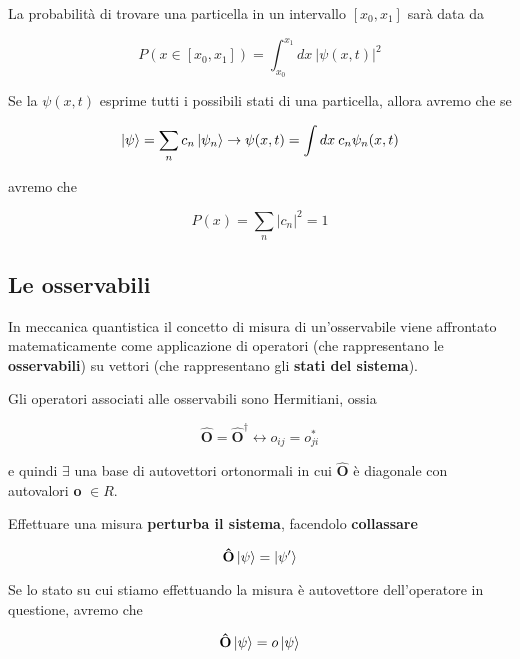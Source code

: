 La probabilità di trovare una particella in un intervallo $[x_0, x_1]$ sarà data da 	

	\begin{equation}
	P(x \in [x_0, x_1])= \int_{x_0}^{x_1} dx \: |\psi(x,t)|^2
	\end{equation}

 Se la $\psi(x,t)$ esprime tutti i possibili stati di una particella, allora avremo che se 
	
	\begin{equation}
	\ket{\psi}= \sum_{n}c_n \ket{\psi_n} \rightarrow \psi(x,t)= \int dx \: c_n \psi_n(x,t)
	\end{equation}
	
avremo che
	
	\begin{equation}
	P(x)= \sum_{n} |c_n|^2= 1 
	\end{equation}
		
\subsection{Le osservabili}

In meccanica quantistica il concetto di misura di un'osservabile viene affrontato matematicamente come applicazione di operatori (che rappresentano le \textbf{osservabili}) su vettori (che rappresentano gli \textbf{stati del sistema}). 

Gli operatori associati alle osservabili sono Hermitiani, ossia 

\begin{equation}
\mathbf{\hat O} = \mathbf{\hat O^\dagger} \longleftrightarrow o_{ij}=o^*_{ji}
\end{equation}

e quindi $\exists$ una base di autovettori ortonormali in cui $\mathbf{\hat O}$ è diagonale con autovalori \textbf{o} $\in R$.\newline

Effettuare una misura \textbf{perturba il sistema}, facendolo \textbf{collassare}

\begin{equation}
\mathbf{\hat O} \ket{\psi}=\ket{\psi'}
\end{equation}

Se lo stato su cui stiamo effettuando la misura è autovettore dell'operatore in questione, avremo che

\begin{equation}
\mathbf{\hat O} \ket{\psi}=o\ket{\psi}
\end{equation}

